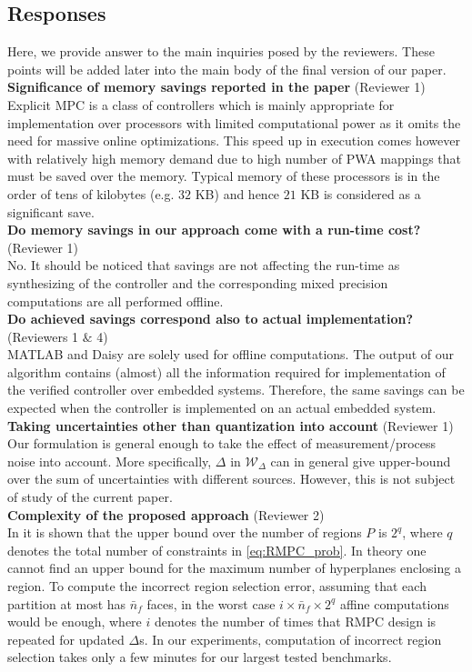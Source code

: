 {\subsection{Responses}
Here, we provide answer to the main inquiries posed by the reviewers. These points will be added later into the main body of the final version of our paper.\\
\textbf{Significance of memory savings reported in the paper} (Reviewer 1)\\
Explicit MPC is a class of controllers which is mainly appropriate for implementation over processors with limited computational power as it omits the need for massive online optimizations. This speed up in execution comes however with relatively high memory demand due to high number of PWA mappings that must be saved over the memory. Typical memory of these processors is in the order of tens of kilobytes (e.g. $32$ KB) and hence $21$ KB is considered as a significant save.\\
\textbf{Do memory savings in our approach come with a run-time cost?} (Reviewer 1)\\
No. It should be noticed that savings are not affecting the run-time as synthesizing of the controller and the corresponding mixed precision computations are all performed offline.\\
\textbf{Do achieved savings correspond also to actual implementation?} (Reviewers 1 $\&$ 4)\\
MATLAB and Daisy are solely used for offline computations. The output of our algorithm contains (almost) all the information required for implementation of the verified controller over embedded systems. Therefore, the same savings can be expected when the controller is implemented on an actual embedded system.\\
\textbf{Taking uncertainties other than quantization into account} (Reviewer 1)\\
Our formulation is general enough to take the effect of measurement/process noise into account. More specifically, $\Delta$ in $\mathcal{W}_{\Delta}$ can in general give upper-bound over the sum of uncertainties with different sources. However, this is not subject of study of the current paper.\\
\textbf{Complexity of the proposed approach} (Reviewer 2)\\
In \cite{Alessio2009} it is shown that the upper bound over the number of regions $P$ is $2^q$, where $q$ denotes the total number of constraints in \autoref{eq:RMPC_prob}. In theory one cannot find an upper bound for the maximum number of hyperplanes enclosing a region. To compute the incorrect region selection error, assuming that each partition at most has $\bar n_f$ faces, in the worst case $i\times\bar n_f\times 2^q$ affine computations would be enough, where $i$ denotes the number of times that RMPC design is repeated for updated $\Delta$s. In our experiments, computation of incorrect region selection takes only a few minutes for our largest tested benchmarks. %
}
